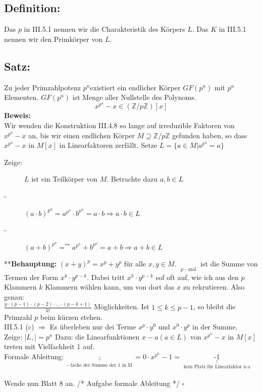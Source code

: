 \subsection{Definition:}
Das $p$ in III.5.1 nennen wir die Charakteristik des Körpers $L$. Das $K$ in III.5.1 nennen wir den Primkörper von $L$.
%
%
%
\subsection{Satz:}
Zu jeder Primzahlpotenz $p^{n}$existiert ein endlicher Körper $GF(p^{n})$ mit $p^{n}$ Elementen. $GF(p^{n})$ ist Menge aller Nullstelle des Polynoms.
\begin{equation*}
x^{p^{n}} -x \in (\mathbb{Z}/p\mathbb{Z})[x]
\end{equation*}
\textbf{Beweis:}\\
Wir wenden die Konstruktion III.4.8 so lange auf irreduzible Faktoren von $x^{p^{n}} -x$ an, bis wir einen endlichen Körper $M \supseteq \mathbb{Z}/p\mathbb{Z}$ gefunden haben, so dass $x^{p^{n}} -x$ in $M[x]$ in Linearfaktoren zerfällt. Setze $L=\{a\in M|a^{p^{n}}=a\}$
\begin{description}
	\item[Zeige:] $L$ ist ein Teilkörper von $M$. Betrachte dazu $a,b \in L$
	\item[-] $(a \cdot b)^{p^{n}} = a^{p^{n}} \cdot b^{p^{n}} = a \cdot b \Rightarrow a \cdot b \in L$
	\item[-] $(a+b)^{p^{n}} =^{\text{**}} a^{p^{n}}+b^{p^{n}}=a+b \Rightarrow a+b \in L$
\end{description}
**\textbf{Behauptung:} $(x+y)^{p} = x^{p}+y^{p}$ für alle $x,y \in M$. $\mathop{\underbrace{(x+y)\cdot \dotsc \cdot (x+y)}}\limits_{p\text{ - mal}}$ ist die Summe von Termen der Form $x^{k}\cdot y^{p-k}$. Dabei tritt $x^{k}\cdot y^{p-k}$ sof oft auf, wie ich aus den $p$ Klammern $k$ Klammern wählen kann, um von dort das $x$ zu rekrutieren. Also genau:\\
$\frac{p\cdot(p-1)\cdot(p-2)\cdot \dotsc \cdot(p-k+1)}{k!}$ Möglichkeiten. Ist $1\leq k \leq p-1$, so bleibt die Primzahl $p$ beim kürzen stehen.\\
 III.5.1 (c) $\Rightarrow$ Es überleben nur dei Terme $x^{p}\cdot y^{0}$ und $x^{0} \cdot y^{p}$ in der Summe.\\
Zeige: $|L,| = p^{n}$ Dazu: die Linearfunktionen $x-a (a \in L)$ von $x^{p^{n}}-x$ in $M[x]$ treten mit Vielfachheit 1 auf. \\
Formale Ableitung: $\mathop{p^{n} \cdot x^{p^{n}-1}}\limits_{\mathop{p^{n}\text{ - fache der Summe der }1\text{ in }M}\limits^{\uparrow}} = 0 \cdot x^{p^{n}} -1 =\mathop{-1}\limits_{\mathop{\text{kein Platz für Linearfaktor }x-a}\limits^{\uparrow}}$\\
\qquad\\
Wende nun Blatt 8 an. /* Aufgabe formale Ableitung */ $\square$
%
%
%
